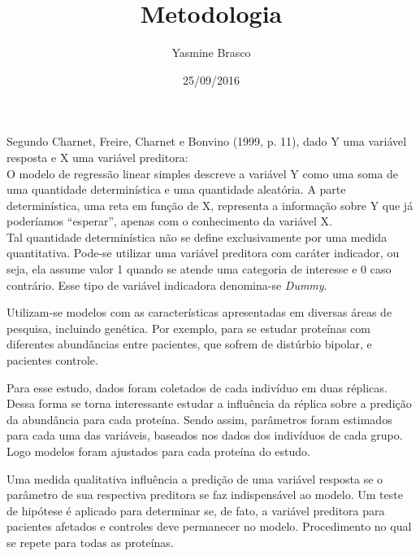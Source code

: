 \documentclass[12pt, a4paper]{article}
\begin{document}
	\title{Metodologia}
	\author{Yasmine Brasco}
	\date{25/09/2016}

Segundo Charnet, Freire, Charnet e Bonvino (1999, p. 11), dado Y uma variável resposta e X uma variável preditora:\\

O modelo de regressão linear simples descreve a variável Y como uma soma de uma quantidade determinística e uma quantidade aleatória. A parte determinística, uma reta em função de X, representa a informação sobre Y que já poderíamos ``esperar'', apenas com o conhecimento da variável X.\\


Tal quantidade determinística não se define exclusivamente por uma medida quantitativa. Pode-se utilizar uma variável preditora com caráter indicador, ou seja, ela assume valor 1 quando se atende uma categoria de interesse e 0 caso contrário. Esse tipo de variável indicadora denomina-se \textit{Dummy}. 

Utilizam-se modelos com as características apresentadas em diversas áreas de pesquisa, incluindo genética. Por exemplo, para se estudar proteínas com diferentes abundâncias entre pacientes, que sofrem de distúrbio bipolar, e pacientes controle. 

Para esse estudo, dados foram coletados de cada indivíduo em duas réplicas. Dessa forma se torna interessante estudar a influência da réplica sobre a predição da abundância para cada proteína. Sendo assim, parâmetros foram estimados para cada uma das variáveis, baseados nos dados dos indivíduos de cada grupo. Logo modelos foram ajustados para cada proteína do estudo.

Uma medida qualitativa influência a predição de uma variável resposta se o parâmetro de sua respectiva preditora se faz indispensável ao modelo. Um teste de hipótese é aplicado para determinar se, de fato, a variável preditora para pacientes afetados e controles deve permanecer no modelo. Procedimento no qual se repete para todas as proteínas.
\end{document}
